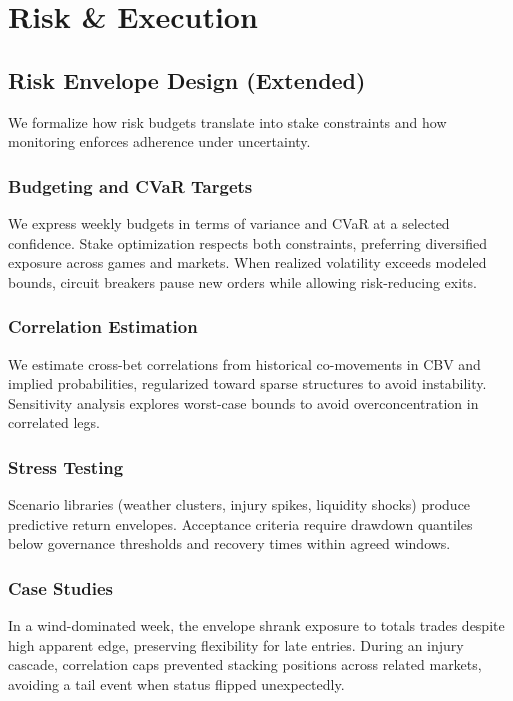 \chapter{Risk \& Execution}\label{app:risk-execution}


\section{Risk Envelope Design (Extended)}\label{app:risk-envelope}
We formalize how risk budgets translate into stake constraints and how monitoring enforces adherence under uncertainty.

\subsection{Budgeting and CVaR Targets}
We express weekly budgets in terms of variance and CVaR at a selected confidence. Stake optimization respects both constraints, preferring diversified exposure across games and markets. When realized volatility exceeds modeled bounds, circuit breakers pause new orders while allowing risk-reducing exits.

\subsection{Correlation Estimation}
We estimate cross-bet correlations from historical co-movements in CBV and implied probabilities, regularized toward sparse structures to avoid instability. Sensitivity analysis explores worst-case bounds to avoid overconcentration in correlated legs.

\subsection{Stress Testing}
Scenario libraries (weather clusters, injury spikes, liquidity shocks) produce predictive return envelopes. Acceptance criteria require drawdown quantiles below governance thresholds and recovery times within agreed windows.

\subsection{Case Studies}
In a wind-dominated week, the envelope shrank exposure to totals trades despite high apparent edge, preserving flexibility for late entries. During an injury cascade, correlation caps prevented stacking positions across related markets, avoiding a tail event when status flipped unexpectedly.

